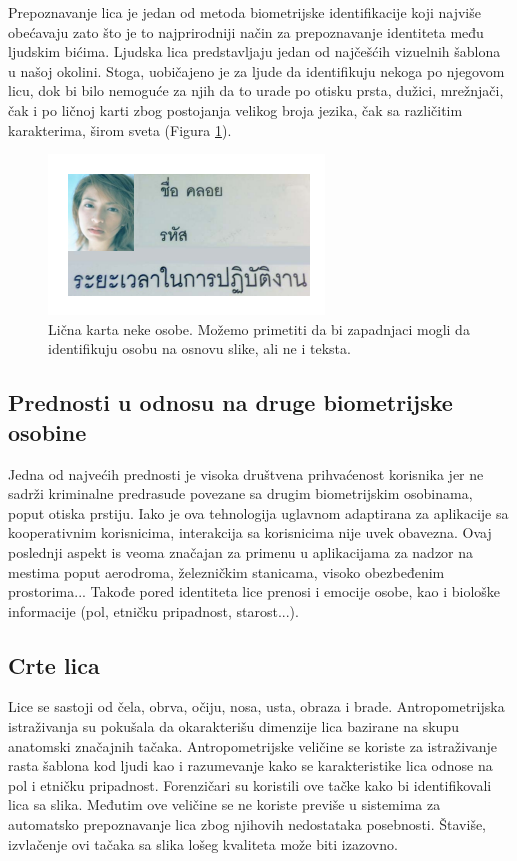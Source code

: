 \documentclass[11pt, a4paper]{article}
\begin{document}
Prepoznavanje lica je jedan od metoda biometrijske identifikacije koji najviše obećavaju zato što je to najprirodniji način za prepoznavanje identiteta među ljudskim bićima. Ljudska lica predstavljaju jedan od najčešćih vizuelnih šablona u našoj okolini. Stoga, uobičajeno je za ljude da identifikuju nekoga po njegovom licu, dok bi bilo nemoguće za njih da to urade po otisku prsta, dužici, mrežnjači, čak i po ličnoj karti zbog postojanja velikog broja jezika, čak sa različitim karakterima, širom sveta (Figura \ref{fig:card}). 

\begin{figure}[h!]
	\centerline{\includegraphics[]{card.png
 }}
	\caption{Lična karta neke osobe. Možemo primetiti da bi zapadnjaci mogli da identifikuju osobu na osnovu slike, ali ne i teksta.}
	\label{fig:card}
\end{figure}

\subsection{Prednosti u odnosu na druge biometrijske osobine}

Jedna od najvećih prednosti je visoka društvena prihvaćenost korisnika jer ne sadrži kriminalne predrasude povezane sa drugim biometrijskim osobinama, poput otiska prstiju. Iako je ova tehnologija uglavnom adaptirana za aplikacije sa kooperativnim korisnicima, interakcija sa korisnicima nije uvek obavezna. Ovaj poslednji aspekt is veoma značajan za primenu u aplikacijama za nadzor na mestima poput aerodroma, železničkim stanicama, visoko obezbeđenim prostorima... Takođe pored identiteta lice prenosi i emocije osobe, kao i biološke informacije (pol, etničku pripadnost, starost...). 


\subsection{Crte lica}

Lice se sastoji od čela, obrva, očiju, nosa, usta, obraza i brade. Antropometrijska istraživanja su pokušala da okarakterišu dimenzije lica bazirane na skupu anatomski značajnih tačaka. Antropometrijske veličine se koriste za istraživanje rasta šablona kod ljudi kao i razumevanje kako se karakteristike lica odnose na pol i etničku pripadnost. Forenzičari su koristili ove tačke kako bi identifikovali lica sa slika. Međutim ove veličine se ne koriste previše u sistemima za automatsko prepoznavanje lica zbog njihovih nedostataka posebnosti. Štaviše, izvlačenje ovi tačaka sa slika lošeg kvaliteta može biti izazovno.
\end{document}
